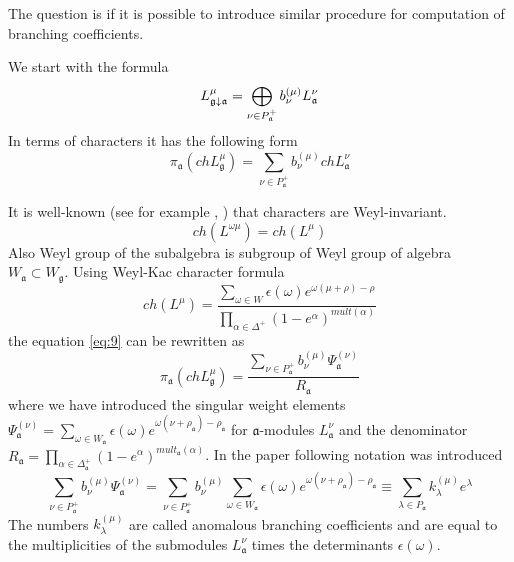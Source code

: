 \documentclass[a4paper,12pt]{article}
\theoremstyle{definition} \newtheorem{Def}{Definition}
\begin{document}
The question is if it is possible to introduce similar procedure for
computation of branching coefficients. 

We start with the formula
\begin{equation}
  \label{eq:6}
  L_{\frak{g}\downarrow \frak{a}}^{\mu }=\bigoplus\limits_{\nu \in P_{\frak{a}%
    }^{+}}b_{\nu }^{\left( \mu \right) }L_{\frak{a}}^{\nu }
\end{equation}
In terms of characters it has the following form
\begin{equation}
  \label{eq:9}
  \pi_{\mathfrak{a}}(ch L^{\mu}_{\mathfrak{g}})=\sum_{\nu\in P^{+}_{\mathfrak{a}}}b^{(\mu)}_{\nu} ch L^{\nu}_{\mathfrak{a}}
\end{equation}

It is well-known (see for example \cite{wakimoto2001idl}, \cite{kac1990idl}) that characters are Weyl-invariant.
\begin{equation}
  \label{eq:8}
  ch(L^{\omega\mu})=ch(L^{\mu})
\end{equation}
Also Weyl group of the subalgebra is subgroup of Weyl group of algebra $W_{\mathfrak{a}}\subset W_{\mathfrak{g}}$.
Using Weyl-Kac character formula
\begin{equation}
  \label{eq:11}
  ch(L^{\mu})=\frac{\sum_{\omega\in W}\epsilon(\omega)e^{\omega(\mu+\rho)-\rho}}{\prod_{\alpha\in \Delta^{+}}(1-e^{\alpha})^{mult(\alpha)}}
\end{equation}
the equation \eqref{eq:9} can be rewritten as
\begin{equation}
  \label{eq:10}
  \pi_{\mathfrak{a}}(ch L^{\mu}_{\mathfrak{g}})=\frac{\sum_{\nu\in P^{+}_{\mathfrak{a}}}b^{(\mu)}_{\nu} \Psi^{(\nu)}_{\mathfrak{a}}}{R_{\mathfrak{a}}}
\end{equation}
where we have introduced the singular weight elements $\Psi^{(\nu)}_{\mathfrak{a}}=\sum_{\omega\in W_{\mathfrak{a}}}\epsilon(\omega)e^{\omega(\nu+\rho_{\mathfrak{a}})-\rho_{\mathfrak{a}}}$ for $\mathfrak{a}$-modules $L^{\nu}_{\mathfrak{a}}$ and the denominator $R_{\mathfrak{a}}=\prod_{\alpha\in \Delta^{+}_{\mathfrak{a}}}(1-e^{\alpha})^{mult_{\mathfrak{a}}(\alpha)}$. In the paper \cite{ilyin812pbc} following notation was introduced
\begin{equation}
  \label{eq:12}
  \sum_{\nu\in P^{+}_{\mathfrak{a}}}b^{(\mu)}_{\nu} \Psi^{(\nu)}_{\mathfrak{a}}
  =\sum_{\nu\in P^{+}_{\mathfrak{a}}}b^{(\mu)}_{\nu} \sum_{\omega\in W_{\mathfrak{a}}}\epsilon(\omega)e^{\omega(\nu+\rho_{\mathfrak{a}})-\rho_{\mathfrak{a}}}
  \equiv\sum_{\lambda\in P_{\mathfrak{a}}}k_{\lambda}^{(\mu)}e^{\lambda}
\end{equation}
The numbers $k_{\lambda}^{(\mu)}$ are called anomalous branching coefficients and are equal to the multiplicities of the submodules $L^{\nu}_{\mathfrak{a}}$ times the determinants $\epsilon(\omega)$.
\end{document}
